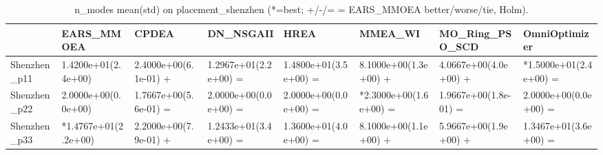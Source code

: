 \begin{table}[t]
\centering
\caption{n_modes mean(std) on placement_shenzhen (*=best; +/-/= = EARS_MMOEA better/worse/tie, Holm).}
\label{tab:placement_shenzhen_n_modes}
\begin{tabular}{llllllll}
\toprule
 & EARS\_MMOEA & CPDEA & DN\_NSGAII & HREA & MMEA\_WI & MO\_Ring\_PSO\_SCD & OmniOptimizer \\
\midrule
Shenzhen\_p11 & 1.4200e+01(2.4e+00) & 2.4000e+00(6.1e-01) + & 1.2967e+01(2.2e+00) = & 1.4800e+01(3.5e+00) = & 8.1000e+00(1.3e+00) + & 4.0667e+00(4.0e+00) + & *1.5000e+01(2.4e+00) = \\
Shenzhen\_p22 & 2.0000e+00(0.0e+00) & 1.7667e+00(5.6e-01) = & 2.0000e+00(0.0e+00) = & 2.0000e+00(0.0e+00) = & *2.3000e+00(1.6e+00) = & 1.9667e+00(1.8e-01) = & 2.0000e+00(0.0e+00) = \\
Shenzhen\_p33 & *1.4767e+01(2.2e+00) & 2.2000e+00(7.9e-01) + & 1.2433e+01(3.4e+00) = & 1.3600e+01(4.0e+00) = & 8.1000e+00(1.1e+00) + & 5.9667e+00(1.9e+00) + & 1.3467e+01(3.6e+00) = \\
\bottomrule
\end{tabular}
\end{table}

